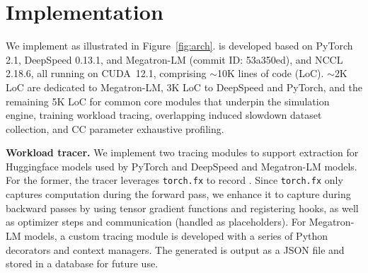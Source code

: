 
\section{Implementation}
\label{sec:implementation}



\noindent We implement \sys as illustrated in Figure~\ref{fig:arch}. 
\sys is developed based on PyTorch 2.1, DeepSpeed 0.13.1, and Megatron-LM (commit ID: 53a350ed), and NCCL 2.18.6, all running on CUDA~12.1, comprising $\sim$10K lines of code (LoC). 
$\sim$2K LoC are dedicated to Megatron-LM, 3K LoC to DeepSpeed and PyTorch, and the remaining 5K LoC for common core modules that underpin the simulation engine, training workload tracing, overlapping induced slowdown dataset collection, and CC parameter exhaustive profiling.

\noindent \textbf{Workload tracer.} 
We implement two tracing modules to support \wg extraction for Huggingface models used by PyTorch and DeepSpeed and Megatron-LM models. For the former, the tracer leverages \texttt{torch.fx} to record \ops. 
Since \texttt{torch.fx} only captures computation \op during the forward pass, we enhance it to capture \ops during backward passes by using tensor gradient functions and registering hooks, as well as optimizer steps and communication \ops (handled as placeholders).
For Megatron-LM models, a custom tracing module is developed with a series of Python decorators and context managers.
The generated \wg is output as a JSON file and stored in a database for future use. 



